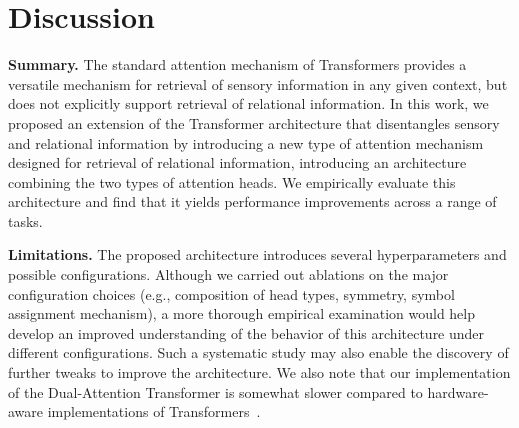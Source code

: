 \section{Discussion}\label{sec:discussion}

\textbf{Summary.} The standard attention mechanism of Transformers provides a versatile mechanism for retrieval of sensory information in any given context, but does not explicitly support retrieval of relational information. In this work, we proposed an extension of the Transformer architecture that disentangles sensory and relational information by introducing a new type of attention mechanism designed for retrieval of relational information, introducing an architecture combining the two types of attention heads. We empirically evaluate this architecture and find that it yields performance improvements across a range of tasks.

\textbf{Limitations.} The proposed architecture introduces several hyperparameters and possible configurations. Although we carried out ablations on the major configuration choices (e.g., composition of head types, symmetry, symbol assignment mechanism), a more thorough empirical examination would help develop an improved understanding of the behavior of this architecture under different configurations. Such a systematic study may also enable the discovery of further tweaks to improve the architecture. We also note that our implementation of the Dual-Attention Transformer is somewhat slower compared to hardware-aware implementations of Transformers~\citep{dao2022flashattention}.